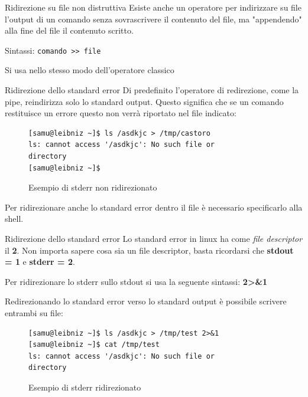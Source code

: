 \documentclass{beamer}
\begin{document}
\begin{frame}{Ridirezione su file non distruttiva}
  Esiste anche un operatore per indirizzare su file l'output di un comando senza 
  sovrascrivere il contenuto del file, ma "appendendo" alla fine del file il
  contenuto scritto.\bigskip

  Sintassi: \texttt{comando >> file}\bigskip

  Si usa nello stesso modo dell'operatore classico\bigskip
\end{frame}

\begin{frame}[fragile]{Ridirezione dello standard error}
  Di predefinito l'operatore di redirezione, come la pipe, reindirizza solo
  lo standard output. Questo significa che se un comando restituisce un errore
  questo non verrà riportato nel file indicato:

  \begin{figure}
    \begin{lstlisting}
[samu@leibniz ~]$ ls /asdkjc > /tmp/castoro
ls: cannot access '/asdkjc': No such file or 
directory
[samu@leibniz ~]$
    \end{lstlisting}
    \caption{Esempio di stderr non ridirezionato}
  \end{figure}

  Per ridirezionare anche lo standard error dentro il file è necessario
  specificarlo alla shell.
\end{frame}

\begin{frame}[fragile]{Ridirezione dello standard error}
  Lo standard error in linux ha come \textit{file descriptor} il \textbf{2}. 
  Non importa sapere cosa sia un file descriptor, basta ricordarsi che
  \textbf{stdout = 1} e \textbf{stderr = 2}. \medskip

  Per ridirezionare lo stderr sullo stdout si usa la seguente sintassi:
  \textbf{2>\&1} \medskip

  Redirezionando lo standard error verso lo standard output è possibile scrivere
  entrambi su file:
  \begin{figure}
    \begin{lstlisting}
[samu@leibniz ~]$ ls /asdkjc > /tmp/test 2>&1 
[samu@leibniz ~]$ cat /tmp/test
ls: cannot access '/asdkjc': No such file or 
directory
    \end{lstlisting}
    \caption{Esempio di stderr ridirezionato}
  \end{figure}
\end{frame}
\end{document}
